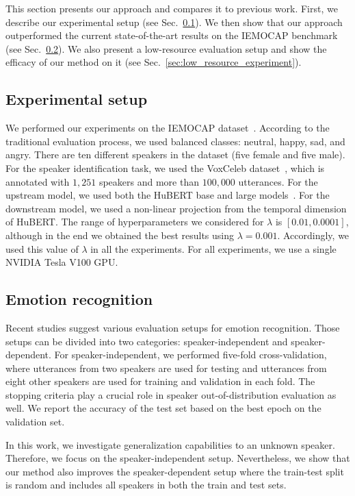 \documentclass{article}
\renewcommand{\[}{\begin{eqnarray}}
\renewcommand{\]}{\end{eqnarray}}
\begin{document}
This section presents our approach and compares it to previous work. First, we describe our experimental setup (see Sec.~\ref{sec:experimental}). We then show that our approach outperformed the current state-of-the-art results on the IEMOCAP benchmark (see Sec.~\ref{sec:emotion_results}). We also present a low-resource evaluation setup and show the efficacy of our method on it (see Sec.~\ref{sec:low_resource_experiment}).


\subsection{Experimental setup}\label{sec:experimental}

We performed our experiments on the IEMOCAP dataset~\cite{iemocap}. According to the traditional evaluation process, we used balanced classes: neutral, happy, sad, and angry. There are ten different speakers in the dataset (five female and five male). For the speaker identification task, we used the VoxCeleb dataset~\cite{voxceleb}, which is annotated with $1,251$ speakers and more than $100,000$ utterances. For the upstream model, we used both the HuBERT base and large models~\cite{hubert}. For the downstream model, we used a non-linear projection from the temporal dimension of HuBERT. The range of hyperparameters we considered for $\lambda$ is $[0.01, 0.0001]$, although in the end we obtained the best results using $\lambda=0.001$. Accordingly, we used this value of $\lambda$ in all the experiments. For all experiments, we use a single NVIDIA Tesla V100 GPU.

\subsection{Emotion recognition}\label{sec:emotion_results}

Recent studies suggest various evaluation setups for emotion recognition. Those setups can be divided into two categories: speaker-independent and speaker-dependent. For speaker-independent, we performed five-fold cross-validation, where utterances from two speakers are used for testing and utterances from eight other speakers are used for training and validation in each fold. The stopping criteria play a crucial role in speaker out-of-distribution evaluation as well. We report the accuracy of the test set based on the best epoch on the validation set.

In this work, we investigate generalization capabilities to an unknown speaker. Therefore, we focus on the speaker-independent setup. Nevertheless, we show that our method also improves the speaker-dependent setup where the train-test split is random and includes all speakers in both the train and test sets.
\end{document}
